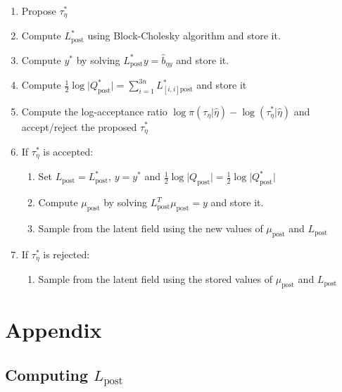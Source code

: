 \documentclass[
  letterpaper,
  DIV=11,
  numbers=noendperiod]{scrartcl}
\providecommand{\tightlist}{%
  \setlength{\itemsep}{0pt}\setlength{\parskip}{0pt}}\usepackage{longtable,booktabs,array}
\begin{document}
\begin{enumerate}
\def\labelenumi{\arabic{enumi}.}
\tightlist
\item
  Propose \(\tau_\eta^*\)
\item
  Compute \(L_\text{post}^*\) using Block-Cholesky algorithm and store
  it.
\item
  Compute \(y^*\) by solving \(L_\text{post}^*y = \hat b_{\eta y}\) and
  store it.
\item
  Compute
  \(\frac12\log\vert Q_\text{post}^*\vert = \sum_{i=1}^{3n} L_{[i,i] \text{post}}^*\)
  and store it
\item
  Compute the log-acceptance ratio
  \(\log \pi(\tau_\eta \vert \hat \eta) - \log(\tau_\eta^*\vert \hat \eta)\)
  and accept/reject the proposed \(\tau_\eta^*\)
\item
  If \(\tau_\eta^*\) is accepted:

  \begin{enumerate}
  \def\labelenumii{\roman{enumii}.}
  \tightlist
  \item
    Set \(L_\text{post} = L_\text{post}^*\), \(y = y^*\) and
    \(\frac12\log\vert Q_\text{post}\vert = \frac12\log\vert Q_\text{post}^*\vert\)
  \item
    Compute \(\mu_\text{post}\) by solving
    \(L_\text{post}^T\mu_\text{post} = y\) and store it.
  \item
    Sample from the latent field using the new values of
    \(\mu_\text{post}\) and \(L_\text{post}\)
  \end{enumerate}
\item
  If \(\tau_\eta^*\) is rejected:

  \begin{enumerate}
  \def\labelenumii{\roman{enumii}.}
  \tightlist
  \item
    Sample from the latent field using the stored values of
    \(\mu_\text{post}\) and \(L_\text{post}\)
  \end{enumerate}
\end{enumerate}

\section{Appendix}\label{appendix}

\subsection{\texorpdfstring{Computing
\(L_\text{post}\)}{Computing L\_\textbackslash text\{post\}}}\label{computing-l_textpost}
\end{document}
